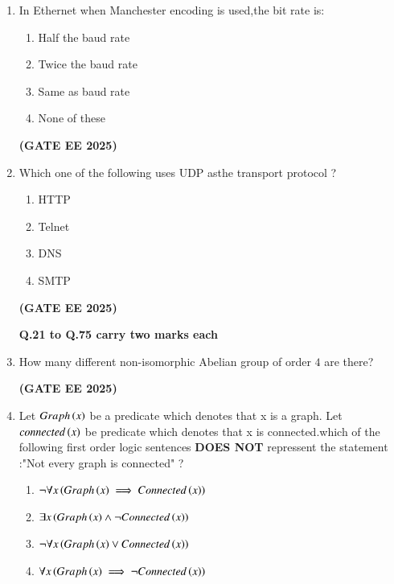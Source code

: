 \documentclass[journal,12pt,onecolumn]{IEEEtran}
\theoremstyle{remark}
\begin{document}
\begin {center}
\begin{enumerate}
\begin{enumerate}
      \item Operator precedence parser.
      \item An LR  parser.
      \item An LALR parser.
  \end{enumerate}
\hfill \textbf{(GATE EE 2025)}
\item In Ethernet when Manchester encoding is used,the bit rate is:
\begin{enumerate}
    \item Half the baud rate
\item Twice the baud rate
\item Same as baud rate
\item None of these
\end{enumerate}
\hfill \textbf{(GATE EE 2025)}
\item    Which one of the following uses UDP asthe transport protocol ?
\begin {enumerate}
\item HTTP
\item Telnet
\item DNS
\item SMTP
\end{enumerate}
\hfill \textbf{(GATE EE 2025)}

 
\begin{center}
    \textbf{Q.21 to Q.75 carry two marks each}
\end{center}
\item How many different non-isomorphic Abelian group of order $4$ are there?
\begin{enumerate}
\end{enumerate}
\hfill \textbf{(GATE EE 2025)}
\item Let $Graph\left(x\right)$ be a predicate which denotes that x is a graph. Let $connected\left(x\right)$ be predicate which denotes that x is connected.which of the following first order logic sentences \textbf{DOES NOT} repressent the statement :"Not every graph  is connected" ?
\begin{enumerate}
    \item $\lnot\forall x \left(Graph\left(x\right)\implies Connected\left(x\right)\right)$
    \item $\exists x \left(Graph\left(x\right)\land\lnot Connected\left(x\right)\right)$
    \item $\lnot\forall x \left(Graph\left(x\right)\lor Connected\left(x\right)\right)$
    \item $\forall x \left(Graph\left(x\right)\implies\lnot Connected\left(x\right)\right)$
    

\end{enumerate}
\end{enumerate}
\end{center}
\end{document}
